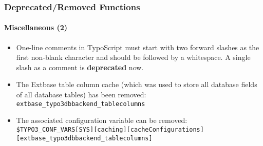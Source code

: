 
\begin{frame}[fragile]
	\frametitle{Deprecated/Removed Functions}
	\framesubtitle{Miscellaneous (2)}

	\begin{itemize}

		\item One-line comments in TypoScript must start with two forward slashes as the first non-blank character
			and should be followed by a whitespace. A single slash as a comment is \textbf{deprecated} now.

		\item The Extbase table column cache (which was used to store all database fields of all database tables)
			has been removed:\newline
			\texttt{extbase\_typo3dbbackend\_tablecolumns}

		\item The associated configuration variable can be removed:
			\smaller
				\texttt{\$TYPO3\_CONF\_VARS[SYS][caching][cacheConfigurations]}\newline
				\tabto{0.4cm}\texttt{[extbase\_typo3dbbackend\_tablecolumns]}
			\normalsize

	\end{itemize}

\end{frame}

